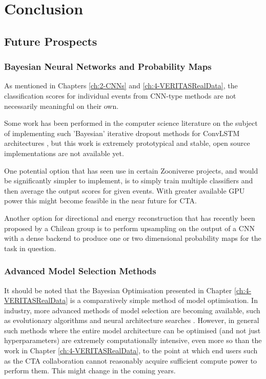\chapter{\label{ch6-Conclusions} Conclusion}
\minitoc
\section{Future Prospects}

\subsection{Bayesian Neural Networks and Probability Maps}

As mentioned in Chapters \ref{ch:2-CNNs} and \ref{ch:4-VERITASRealData}, the classification scores for individual events from CNN-type methods are not necessarily meaningful on their own.

Some work has been performed in the computer science literature on the subject of implementing such 'Bayesian' iterative dropout methods for ConvLSTM architectures \cite{bayesconv},  but this work is extremely prototypical and stable, open source implementations are not available yet.

One potential option that has seen use in certain Zooniverse projects, and would be significantly simpler to implement, is to simply train multiple classifiers and then average the output scores for given events. With greater available GPU power this might become feasible in the near future for CTA.

Another option for directional and energy reconstruction that has recently been proposed by a Chilean group is to perform upsampling on the output of a CNN with a dense backend to produce one or two dimensional probability maps for the task in question.
\subsection{Advanced Model Selection Methods}

It should be noted that the Bayesian Optimisation presented in Chapter \ref{ch:4-VERITASRealData} is a comparatively simple method of model optimisation. In industry, more advanced methods of model selection are becoming available, such as evolutionary algorithms \cite{evodeep} and neural architecture searches \cite{neural}. However, in general such methods where the entire model architecture can be optimised (and not just hyperparameters) are extremely computationally intensive, even more so than the work in Chapter \ref{ch:4-VERITASRealData}, to the point at which end users such as the CTA collaboration cannot reasonably acquire sufficient compute power to perform them. This might change in the coming years.

